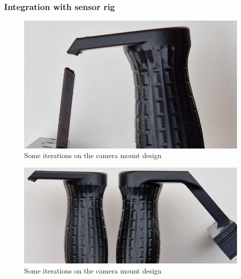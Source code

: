 \subsubsection{Integration with sensor rig}

\begin{figure}[H]
    \centering
    \includegraphics[width=\textwidth]{figures/3d_print/break.png}
    \caption{Some iterations on the camera mount design}
    \label{fig:hancle_break}
\end{figure}

\begin{figure}[H]
    \centering
    \includegraphics[width=\textwidth]{figures/3d_print/thickness.png}
    \caption{Some iterations on the camera mount design}
    \label{fig:handle_thickness}
\end{figure}